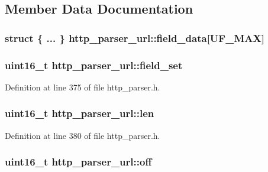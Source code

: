 \subsection{Member Data Documentation}
\hypertarget{structhttp__parser__url_a96a1fed71f3471692e9832f91b42f7db}{
\subsubsection[{field\-\_\-data}]{\setlength{\rightskip}{0pt plus 5cm}struct \{ ... \}   http\-\_\-parser\-\_\-url\-::field\-\_\-data\mbox{[}{\bf U\-F\-\_\-\-M\-A\-X}\mbox{]}}}\label{structhttp__parser__url_a96a1fed71f3471692e9832f91b42f7db}
\hypertarget{structhttp__parser__url_a77af61a480f11c41938810dd76ca49eb}{
\subsubsection[{field\-\_\-set}]{\setlength{\rightskip}{0pt plus 5cm}uint16\-\_\-t http\-\_\-parser\-\_\-url\-::field\-\_\-set}}\label{structhttp__parser__url_a77af61a480f11c41938810dd76ca49eb}


Definition at line 375 of file http\-\_\-parser.\-h.

\hypertarget{structhttp__parser__url_a60fb784a989dd5a95e5bd19d468d22c7}{
\subsubsection[{len}]{\setlength{\rightskip}{0pt plus 5cm}uint16\-\_\-t http\-\_\-parser\-\_\-url\-::len}}\label{structhttp__parser__url_a60fb784a989dd5a95e5bd19d468d22c7}


Definition at line 380 of file http\-\_\-parser.\-h.

\hypertarget{structhttp__parser__url_a6510826f3aa9a1100ac5f714323edeb1}{
\subsubsection[{off}]{\setlength{\rightskip}{0pt plus 5cm}uint16\-\_\-t http\-\_\-parser\-\_\-url\-::off}}\label{structhttp__parser__url_a6510826f3aa9a1100ac5f714323edeb1}


